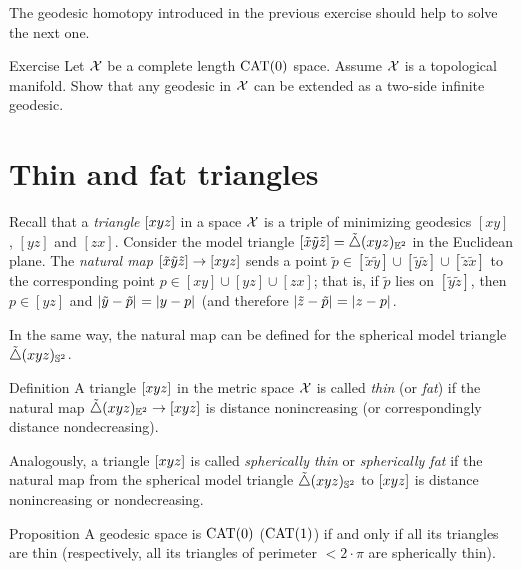 The geodesic homotopy introduced in the previous exercise should help to solve the next one.

\begin{thm}{Exercise}\label{ex:CAT-mnfld=>ext.geod}
Let $\mathcal{X}$ be a complete length $\mathrm{CAT}(0)$ space.
Assume $\mathcal{X}$ is a topological manifold.
Show that any geodesic in $\mathcal{X}$ can be extended 
as a two-side infinite geodesic.
\end{thm}
 

\section{Thin and fat triangles}

Recall that a \emph{triangle} $[xyz]$ in a space $\mathcal{X}$ 
is a triple of minimizing geodesics $[xy]$, $[yz]$ and $[zx]$.
Consider the  model triangle $[\tilde x\tilde y\tilde z]=\tilde\triangle{}({x}{y}{z})_{\mathbb{E}^2}$ in the Euclidean plane.
The \emph{natural map} $[\tilde x\tilde y\tilde z]\to [xyz]$ 
sends a point $\tilde p\in[\tilde x\tilde y]\cup[\tilde y\tilde z]\cup[\tilde z\tilde x]$ to the corresponding point $p\in[ x y]\cup[y z]\cup[ z x]$;
that is, if $\tilde p$ lies on $[\tilde y\tilde z]$,
then $p\in [y z]$ and $\dist{\tilde y}{\tilde p}{}=\dist{y}{p}{}$ (and therefore $\dist{\tilde z}{\tilde p}{}=\dist{z}{p}{}$.

In the same way, the natural map can be defined for the spherical model triangle $\tilde\triangle{}({x}{y}{z})_{\mathbb{S}^2}$.
 
\begin{thm}{Definition}\label{def:k-thin}
A triangle $[xyz]$ in the metric space $\mathcal{X}$ 
is called \emph{thin} (or \emph{fat}) if the natural map $\tilde\triangle{}({x}{y}{z})_{\mathbb{E}^2}\to [xyz]$ is distance nonincreasing (or correspondingly distance nondecreasing).

Analogously, a triangle $[xyz]$ 
is called \emph{spherically thin} or \emph{spherically fat} if
the natural map from the spherical model triangle $\tilde\triangle{}({x}{y}{z})_{\mathbb{S}^2}$ to $[xyz]$ is distance nonincreasing or nondecreasing.
\end{thm}

\begin{thm}{Proposition}\label{prop:thin=cat}
A geodesic space is $\mathrm{CAT}(0)$ 
($\mathrm{CAT}(1)$) 
if and only if 
all its triangles are thin (respectively, all its triangles of perimeter $<2\cdot\pi$ are spherically thin).
\end{thm}

